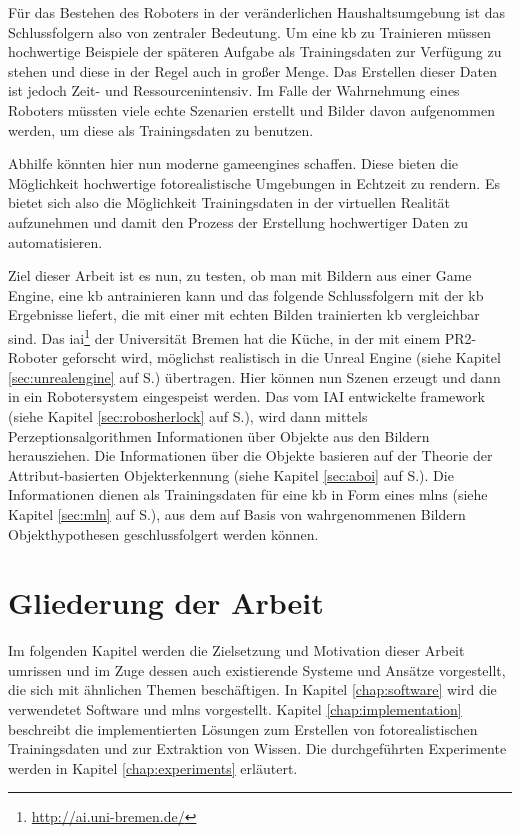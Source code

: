 Für das Bestehen des Roboters in der veränderlichen Haushaltsumgebung ist das Schlussfolgern also von zentraler Bedeutung. Um eine \gls{kb} zu Trainieren müssen hochwertige Beispiele der späteren Aufgabe als Trainingsdaten zur Verfügung zu stehen und diese in der Regel auch in großer Menge. Das Erstellen dieser Daten ist jedoch Zeit- und Ressourcenintensiv. Im Falle der Wahrnehmung eines Roboters müssten viele echte Szenarien erstellt und Bilder davon aufgenommen werden, um diese als Trainingsdaten zu benutzen. \par      
Abhilfe könnten hier nun moderne \glspl{gameengine} schaffen. Diese bieten die Möglichkeit hochwertige fotorealistische Umgebungen in Echtzeit zu rendern. Es bietet sich also die Möglichkeit Trainingsdaten in der virtuellen Realität aufzunehmen und damit den Prozess der Erstellung hochwertiger Daten zu automatisieren. \par  
Ziel dieser Arbeit ist es nun, zu testen, ob man mit Bildern aus einer Game Engine, eine \gls{kb} antrainieren kann und das folgende Schlussfolgern mit der \gls{kb} Ergebnisse liefert, die mit einer mit echten Bilden trainierten \gls{kb} vergleichbar sind. Das \gls{iai}\footnote{\url{http://ai.uni-bremen.de/}} der Universität Bremen hat die Küche, in der mit einem PR2-Roboter geforscht wird, möglichst realistisch in die Unreal Engine (siehe Kapitel \ref{sec:unrealengine} auf S.\pageref{sec:unrealengine}) übertragen. Hier können nun Szenen erzeugt und dann in ein Robotersystem eingespeist werden. Das vom IAI entwickelte \gls{framework} \robosherlock (siehe Kapitel \ref{sec:robosherlock} auf S.\pageref{sec:robosherlock}), wird dann mittels Perzeptionsalgorithmen Informationen über Objekte aus den Bildern herausziehen. Die Informationen über die Objekte basieren auf der Theorie der Attribut-basierten Objekterkennung (siehe Kapitel \ref{sec:aboi} auf S.\pageref{sec:aboi}). Die Informationen dienen als Trainingsdaten für eine \gls{kb} in Form eines \gls{mlns} (siehe Kapitel \ref{sec:mln} auf S.\pageref{sec:mln}), aus dem auf Basis von wahrgenommenen Bildern Objekthypothesen  geschlussfolgert werden können.  

\section{Gliederung der Arbeit}
\label{sec:gliederung}

Im folgenden Kapitel werden die Zielsetzung und Motivation dieser Arbeit umrissen und im Zuge dessen auch existierende Systeme und Ansätze vorgestellt, die sich mit ähnlichen Themen beschäftigen. In Kapitel \ref{chap:software} wird die verwendetet Software und \glspl{mln} vorgestellt. Kapitel \ref{chap:implementation} beschreibt die implementierten Lösungen zum Erstellen von fotorealistischen Trainingsdaten und zur Extraktion von Wissen. Die durchgeführten Experimente werden in Kapitel \ref{chap:experiments} erläutert. 

   

